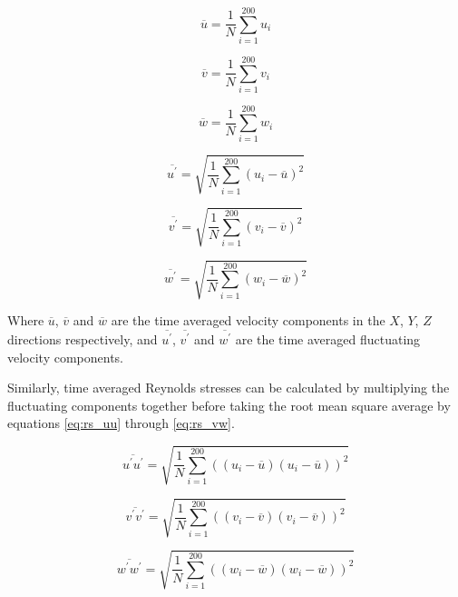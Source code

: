 \begin{equation}
\overline{u}  = \frac{1}{N} \sum_{i=1}^{200} u_i
\label{eq:ubar}
\end{equation}

\begin{equation}
\overline{v}  = \frac{1}{N} \sum_{i=1}^{200} v_i
\end{equation}

\begin{equation}
\overline{w}  = \frac{1}{N} \sum_{i=1}^{200} w_i
\end{equation}

\begin{equation}
\overline{u^\prime} = \sqrt{\frac{1}{N} \sum_{i=1}^{200} (u_i - \overline{u})^2}
\end{equation}

\begin{equation}
\overline{v^\prime} = \sqrt{\frac{1}{N} \sum_{i=1}^{200} (v_i - \overline{v})^2}
\end{equation}

\begin{equation}
\overline{w^\prime} = \sqrt{\frac{1}{N} \sum_{i=1}^{200} (w_i - \overline{w})^2}
\label{eq:wprime}
\end{equation}

Where $\overline{u}$, $\overline{v}$ and $\overline{w}$ are the time averaged 
velocity 
components in the $X$, $Y$, $Z$ directions respectively, and  
$\overline{u^\prime}$, $\overline{v^\prime}$ and $\overline{w^\prime}$ are the 
time averaged fluctuating velocity components.

Similarly, time averaged Reynolds stresses can be calculated by multiplying the 
fluctuating components together before taking the root mean square average by 
equations \ref{eq:rs_uu} through \ref{eq:rs_vw}.

\begin{equation}
\overline{u^\prime u^\prime} = \sqrt{\frac{1}{N} \sum_{i=1}^{200} 
	((u_i - \overline{u})(u_i - \overline{u}))^2}
\label{eq:rs_uu}
\end{equation}

\begin{equation}
\overline{v^\prime v^\prime} = \sqrt{\frac{1}{N} \sum_{i=1}^{200} 
	((v_i - \overline{v})(v_i - \overline{v}))^2}
\end{equation}

\begin{equation}
\overline{w^\prime w^\prime} = \sqrt{\frac{1}{N} \sum_{i=1}^{200} 
	((w_i - \overline{w})(w_i - \overline{w}))^2}
\end{equation}

